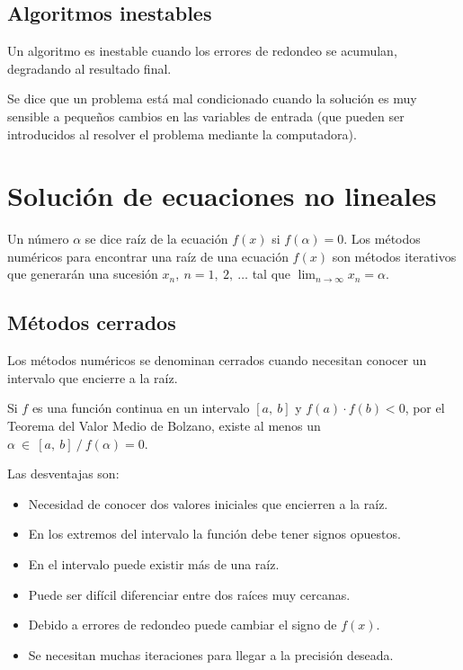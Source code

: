 \documentclass{article}
\begin{document}
\subsection{Algoritmos inestables}

Un algoritmo es inestable cuando los errores de redondeo se acumulan, degradando
al resultado final.

Se dice que un problema está mal condicionado cuando la solución es muy sensible
a pequeños cambios en las variables de entrada (que pueden ser introducidos al 
resolver el problema mediante la computadora).

\section{Solución de ecuaciones no lineales}

Un número $\alpha$ se dice raíz de la ecuación $f(x)$ si $f(\alpha) = 0$.
Los métodos numéricos para encontrar una raíz de una ecuación $f(x)$ son métodos
iterativos que generarán una sucesión ${x_n},\ n=1,\ 2,\ \dots$ tal que 
$\lim_{n\to\infty} x_n = \alpha$.

\subsection{Métodos cerrados}

Los métodos numéricos se denominan cerrados cuando necesitan conocer un 
intervalo que encierre a la raíz.

Si $f$ es una función continua en un intervalo $[a,\ b]$ y 
$f(a) \cdot f(b) < 0$, por el Teorema del Valor Medio de Bolzano, existe al 
menos un $\alpha\ \in\ [a,\ b]\ /\ f(\alpha)=0$.

Las desventajas son:

\begin{itemize}
    \item Necesidad de conocer dos valores iniciales que encierren a la raíz.
    \item En los extremos del intervalo la función debe tener signos opuestos.
    \item En el intervalo puede existir más de una raíz.
    \item Puede ser difícil diferenciar entre dos raíces muy cercanas.
    \item Debido a errores de redondeo puede cambiar el signo de $f(x)$.
    \item Se necesitan muchas iteraciones para llegar a la precisión deseada.
\end{itemize}
\end{document}
